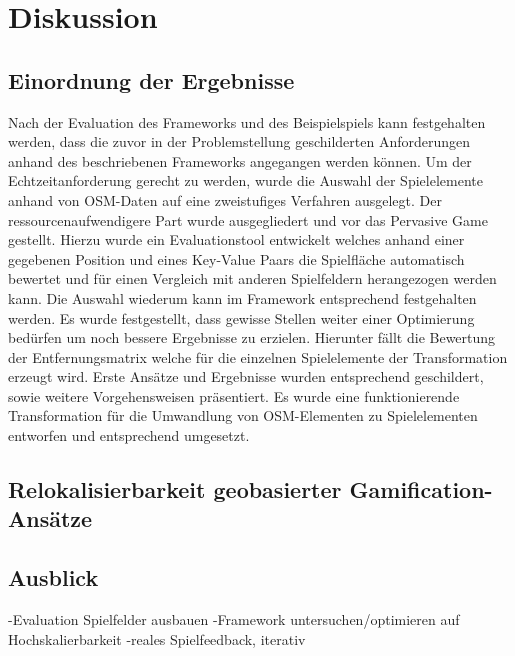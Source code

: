 \chapter{Diskussion}
\label{sec:S7_Diskussion}

\section*{Einordnung der Ergebnisse}

Nach der Evaluation des Frameworks und des Beispielspiels kann festgehalten werden, dass die zuvor in der Problemstellung geschilderten Anforderungen anhand des beschriebenen Frameworks angegangen werden können. Um der Echtzeitanforderung gerecht zu werden, wurde die Auswahl der Spielelemente anhand von OSM-Daten auf eine zweistufiges Verfahren ausgelegt. Der ressourcenaufwendigere Part wurde ausgegliedert und vor das Pervasive Game gestellt. Hierzu wurde ein Evaluationstool entwickelt welches anhand einer gegebenen Position und eines Key-Value Paars die Spielfläche automatisch bewertet und für einen Vergleich mit anderen Spielfeldern herangezogen werden kann.
Die Auswahl wiederum kann im Framework entsprechend festgehalten werden. Es wurde festgestellt, dass gewisse Stellen weiter einer Optimierung bedürfen um noch bessere Ergebnisse zu erzielen. Hierunter fällt die Bewertung der Entfernungsmatrix welche für die einzelnen Spielelemente der Transformation erzeugt wird. Erste Ansätze und Ergebnisse wurden entsprechend geschildert, sowie weitere Vorgehensweisen präsentiert.
Es wurde eine funktionierende Transformation für die Umwandlung von OSM-Elementen zu Spielelementen entworfen und entsprechend umgesetzt.


\section*{Relokalisierbarkeit geobasierter Gamification-Ansätze}

\section*{Ausblick}

-Evaluation Spielfelder ausbauen
-Framework untersuchen/optimieren auf Hochskalierbarkeit
-reales Spielfeedback, iterativ